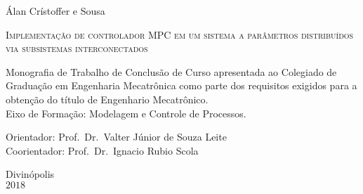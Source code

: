 \begin{center}
    \large Álan Crístoffer e Sousa
\end{center}

\vspace*{1.5cm}

\begin{center}
    \Large{\textsc{Implementação de controlador MPC em um sistema a parâmetros
                  distribuídos via subsistemas interconectados}} %
\end{center}

\vspace*{1.5cm}

\begin{flushright}
    \begin{minipage}{9.0cm}
        Monografia de Trabalho de Conclusão de Curso apresentada ao Colegiado de
        Graduação em Engenharia Mecatrônica como  parte dos requisitos exigidos
        para a obtenção do título de Engenhario Mecatrônico.\\
        Eixo de Formação: Modelagem e Controle de Processos.

        \vspace*{1cm}

        Orientador: Prof.\ Dr.\ Valter Júnior de Souza Leite\\
        Coorientador: Prof.\ Dr.\ Ignacio Rubio Scola
    \end{minipage}
\end{flushright}

\vspace*{1cm}

\columnwidth{}
\centerline{} %

\null\vfill

\begin{center}
    Divinópolis\\
    \(2018\) %
\end{center}

\cleardoublepage{}


